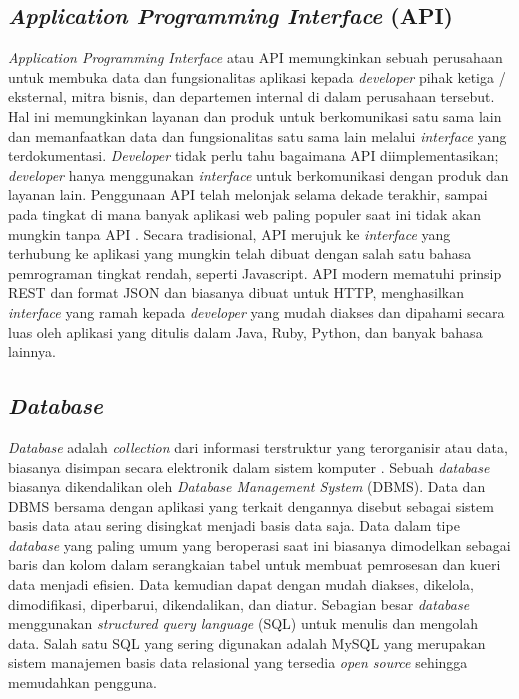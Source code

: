 \begin{flushleft}
\begin{justify}
        \subsection{\textit{Application Programming Interface} (API)}
            \textit{Application Programming Interface} atau API memungkinkan sebuah perusahaan untuk membuka data dan fungsionalitas aplikasi kepada \textit{developer} pihak ketiga / eksternal, mitra bisnis, dan departemen internal di dalam perusahaan tersebut. 
            Hal ini memungkinkan layanan dan produk untuk berkomunikasi satu sama lain dan memanfaatkan data dan fungsionalitas satu sama lain melalui \textit{interface} yang terdokumentasi. 
            \textit{Developer} tidak perlu tahu bagaimana API diimplementasikan; \textit{developer} hanya menggunakan \textit{interface} untuk berkomunikasi dengan produk dan layanan lain. 
            Penggunaan API telah melonjak selama dekade terakhir, sampai pada tingkat di mana banyak aplikasi web paling populer saat ini tidak akan mungkin tanpa API \cite{API}. Secara tradisional, API merujuk ke \textit{interface} yang terhubung ke aplikasi yang mungkin telah dibuat dengan salah satu bahasa pemrograman tingkat rendah, seperti Javascript. API modern mematuhi prinsip REST dan format JSON dan biasanya dibuat untuk HTTP, menghasilkan \textit{interface} yang ramah kepada \textit{developer} yang mudah diakses dan dipahami secara luas oleh aplikasi yang ditulis dalam Java, Ruby, Python, dan banyak bahasa lainnya.
            \\


        \subsection{\textit{Database}}
        \textit{Database} adalah \textit{collection} dari informasi terstruktur yang terorganisir atau data, biasanya disimpan secara elektronik dalam sistem komputer \cite{Database}. Sebuah \textit{database} biasanya dikendalikan oleh \textit{Database Management System} (DBMS). Data dan DBMS bersama dengan aplikasi yang terkait dengannya disebut sebagai sistem basis data atau sering disingkat menjadi basis data saja.
        Data dalam tipe \textit{database} yang paling umum yang beroperasi saat ini biasanya dimodelkan sebagai baris dan kolom dalam serangkaian tabel untuk membuat pemrosesan dan kueri data menjadi efisien. Data kemudian dapat dengan mudah diakses, dikelola, dimodifikasi, diperbarui, dikendalikan, dan diatur. Sebagian besar \textit{database} menggunakan \textit{structured query language} (SQL) untuk menulis dan mengolah data. 
        Salah satu SQL yang sering digunakan adalah MySQL yang merupakan sistem manajemen basis data relasional yang tersedia \textit{open source} sehingga memudahkan pengguna.
        \\

\end{justify}
\end{flushleft}
